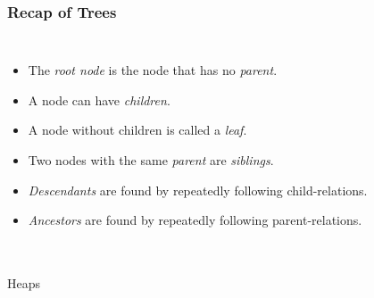 \begin{frame}
	\frametitle{Recap of Trees}
	\begin{columns}[T]
		\begin{itemize}
			\item The \textit{root node} is the node that has no \textit{parent}.
			\item A node can have \textit{children}.
			\item A node without children is called a \textit{leaf}.
			\item Two nodes with the same \textit{parent} are \textit{siblings}.
			\item \textit{Descendants} are found by repeatedly following child-relations.
			\item \textit{Ancestors} are found by repeatedly following parent-relations.
		\end{itemize}
	\end{columns}
\end{frame}

\begin{frame}[fragile]\frametitle{}
\begin{center}
{\Large Heaps}
\end{center}

\end{frame}

